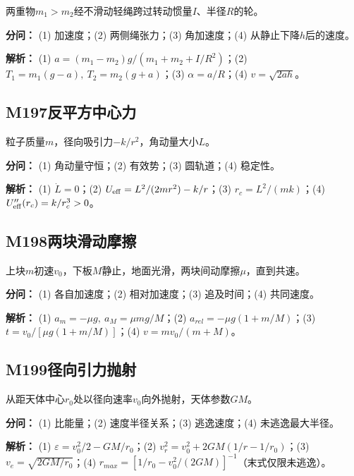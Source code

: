 两重物$m_1>m_2$经不滑动轻绳跨过转动惯量$I$、半径$R$的轮。

\par\textbf{分问：} (1) 加速度；(2) 两侧绳张力；(3) 角加速度；(4) 从静止下降$h$后的速度。

\par\textbf{解析：} (1) $a=(m_1-m_2)g/(m_1+m_2+I/R^2)$；(2) $T_1=m_1(g-a),\ T_2=m_2(g+a)$；(3) $\alpha=a/R$；(4) $v=\sqrt{2ah}$。

\medskip

\subsection*{M197\quad 反平方中心力}

粒子质量$m$，径向吸引力$-k/r^2$，角动量大小$L$。

\par\textbf{分问：} (1) 角动量守恒；(2) 有效势；(3) 圆轨道；(4) 稳定性。

\par\textbf{解析：} (1) $\dot L=0$；(2) $U_{\rm eff}=L^2/(2mr^2)-k/r$；(3) $r_c=L^2/(mk)$；(4) $U_{\rm eff}''(r_c)=k/r_c^3>0$。

\medskip

\subsection*{M198\quad 两块滑动摩擦}

上块$m$初速$v_0$，下板$M$静止，地面光滑，两块间动摩擦$\mu$，直到共速。

\par\textbf{分问：} (1) 各自加速度；(2) 相对加速度；(3) 追及时间；(4) 共同速度。

\par\textbf{解析：} (1) $a_m=-\mu g,\ a_M=\mu mg/M$；(2) $a_{rel}=-\mu g(1+m/M)$；(3) $t=v_0/[\mu g(1+m/M)]$；(4) $v=mv_0/(m+M)$。

\medskip

\subsection*{M199\quad 径向引力抛射}

从距天体中心$r_0$处以径向速率$v_0$向外抛射，天体参数$GM$。

\par\textbf{分问：} (1) 比能量；(2) 速度半径关系；(3) 逃逸速度；(4) 未逃逸最大半径。

\par\textbf{解析：} (1) $\varepsilon=v_0^2/2-GM/r_0$；(2) $v_r^2=v_0^2+2GM(1/r-1/r_0)$；(3) $v_e=\sqrt{2GM/r_0}$；(4) $r_{max}=[1/r_0-v_0^2/(2GM)]^{-1}$（末式仅限未逃逸）。

